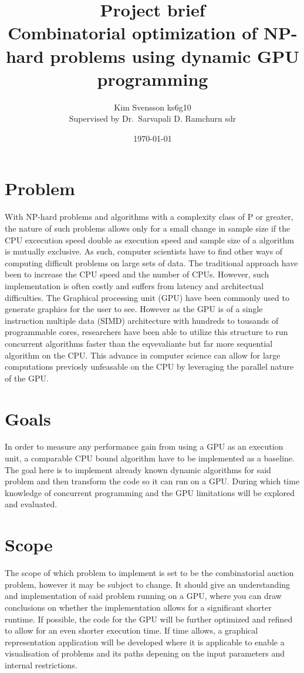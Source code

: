 \documentclass[a4paper, 12pt]{article}
\title{Project brief \\ Combinatorial optimization of NP-hard problems using dynamic GPU programming}
\author{Kim Svensson ks6g10 \\ Supervised by Dr.\ Sarvapali D. Ramchurn sdr}
\date{\today}
\begin{document}
\maketitle
\thispagestyle{empty}
\section{Problem}
With NP-hard problems and algorithms with a complexity class of P or greater, the nature of such problems allows only for a small change in sample size if the CPU excecution speed double as execution speed and sample size of a algorithm is mutually exclusive. As such, computer scientists have to find other ways of computing difficult problems on large sets of data. The traditional approach have been to increase the CPU speed and the number of CPUs. However, such implementation is often costly and suffers from latency and architectual difficulties. The Graphical processing unit (GPU) have been commonly used to generate graphics for the user to see. However as the GPU is of a single instruction multiple data (SIMD) architecture with hundreds to tousands of programmable cores, researchers have been able to utilize this structure to run concurrent algorithms faster than the eqvevaliante but far more sequential algorithm on the CPU. This advance in computer science can allow for large computations previosly unfeasable on the CPU by leveraging the parallel nature of the GPU. 


\section{Goals}
In order to measure any performance gain from using a GPU as an execution unit, a comparable CPU bound algorithm have to be implemented as a baseline. The goal here is to implement already known dynamic algorithms for said problem and then transform the code so it can run on a GPU. During which time knowledge of concurrent programming and the GPU limitations will be explored and evaluated.

\section{Scope}

The scope of which problem to implement is set to be the combinatorial auction problem, however it may be subject to change. It should give an understanding and implementation of said problem running on a GPU, where you can draw conclusions on whether the implementation allows for a significant shorter runtime. If possible, the code for the GPU will be further optimized and refined to allow for an even shorter execution time.
If time allows, a graphical representation application will be developed where it is applicable to enable a visualisation of problems and its paths depening on the input parameters and internal restrictions.
\end{document}
